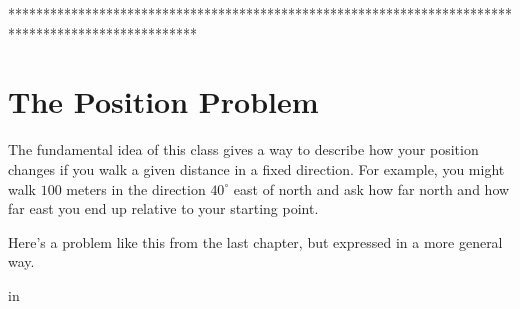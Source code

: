 \documentclass{ximera}
\newcommand{\pskip}{\vskip 0.1 in}
\begin{document}







\iffalse

***************************************************************************************************

\section{The Position Problem}

The fundamental idea of this class gives a way to describe how your position changes if you walk a given distance in a fixed direction. For example, you might walk $100$ meters in the direction $40^\circ$ east of north and ask how far north and how far east you end up relative to your starting point.

Here's a problem like this from the last chapter, but expressed in a more general way.

\pskip
\end{document}
